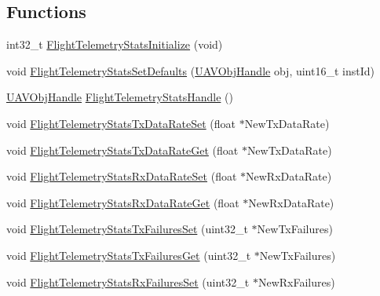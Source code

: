 \subsection*{\-Functions}
\begin{DoxyCompactItemize}
\item 
int32\-\_\-t \hyperlink{group___flight_telemetry_stats_gac35976202097a5db382fb6bac9aac6b9}{\-Flight\-Telemetry\-Stats\-Initialize} (void)
\item 
void \hyperlink{group___flight_telemetry_stats_ga7bb1bb4f441970013832cc2b815dd2e1}{\-Flight\-Telemetry\-Stats\-Set\-Defaults} (\hyperlink{targets_2_u_a_v_objects_2inc_2uavobjectmanager_8h_a279053e22be53ce9f895043aaeb91e3b}{\-U\-A\-V\-Obj\-Handle} obj, uint16\-\_\-t inst\-Id)
\item 
\hyperlink{targets_2_u_a_v_objects_2inc_2uavobjectmanager_8h_a279053e22be53ce9f895043aaeb91e3b}{\-U\-A\-V\-Obj\-Handle} \hyperlink{group___flight_telemetry_stats_ga125f1550fc5605def3f12c740e44c998}{\-Flight\-Telemetry\-Stats\-Handle} ()
\item 
void \hyperlink{group___flight_telemetry_stats_gaa945fbaaefc232486195c50a85323a9c}{\-Flight\-Telemetry\-Stats\-Tx\-Data\-Rate\-Set} (float $\ast$\-New\-Tx\-Data\-Rate)
\item 
void \hyperlink{group___flight_telemetry_stats_ga2996f434e28f288ff5d5bf1d616b80f9}{\-Flight\-Telemetry\-Stats\-Tx\-Data\-Rate\-Get} (float $\ast$\-New\-Tx\-Data\-Rate)
\item 
void \hyperlink{group___flight_telemetry_stats_ga28b79b9e40f0364789cc7b69eccf8882}{\-Flight\-Telemetry\-Stats\-Rx\-Data\-Rate\-Set} (float $\ast$\-New\-Rx\-Data\-Rate)
\item 
void \hyperlink{group___flight_telemetry_stats_gad994a57817982fdfad8eb94ec3576a60}{\-Flight\-Telemetry\-Stats\-Rx\-Data\-Rate\-Get} (float $\ast$\-New\-Rx\-Data\-Rate)
\item 
void \hyperlink{group___flight_telemetry_stats_ga4dcbe46722ca3aa58c5b500f9eec612b}{\-Flight\-Telemetry\-Stats\-Tx\-Failures\-Set} (uint32\-\_\-t $\ast$\-New\-Tx\-Failures)
\item 
void \hyperlink{group___flight_telemetry_stats_ga1aa6c6e746aa531d55d6b778fa56ec6f}{\-Flight\-Telemetry\-Stats\-Tx\-Failures\-Get} (uint32\-\_\-t $\ast$\-New\-Tx\-Failures)
\item 
void \hyperlink{group___flight_telemetry_stats_gaeb19a4a59bca14bfe2dc0a86222eeac8}{\-Flight\-Telemetry\-Stats\-Rx\-Failures\-Set} (uint32\-\_\-t $\ast$\-New\-Rx\-Failures)
\item 

\end{DoxyCompactItemize}
